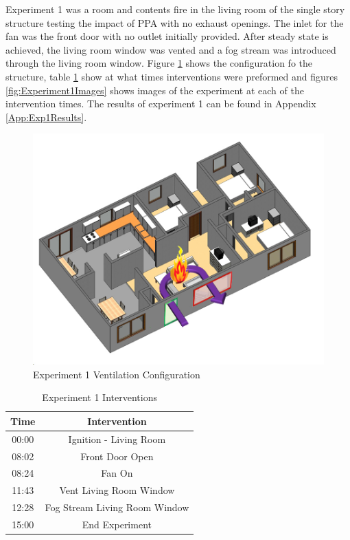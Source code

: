 \documentclass{article}
\begin{document}
Experiment 1 was a room and contents fire in the living room of the single story structure testing the impact of PPA with no exhaust openings. The inlet for the fan was the front door with no outlet initially provided. After steady state is achieved, the living room window was vented and a fog stream was introduced through the living room window. Figure \ref{fig:Exp1VentConfig} shows the configuration fo the structure, table \ref{Table:Exp1Interventions} show at what times interventions were preformed and figures \ref{fig:Experiment1Images} shows images of the experiment at each of the intervention times. The results of experiment 1 can be found in Appendix \ref{App:Exp1Results}.

 \begin{figure}[h!]
 	\centering
 	\includegraphics[width=5in]{0_Images/FireExperiments/Single_Story/Experiment_1.jpg}
 	\caption{Experiment 1 Ventilation Configuration}
 	\label{fig:Exp1VentConfig}
 \end{figure}

\begin{table}[H]
	\centering
	\caption{Experiment 1 Interventions}
	\begin{tabular}{|c|c|} 
		\hline
		Time & Intervention \\ \hline \hline
		00:00 & Ignition - Living Room \\ \hline
		08:02 & Front Door Open \\ \hline
		08:24 & Fan On \\ \hline
		11:43 & Vent Living Room Window \\ \hline
		12:28 & Fog Stream Living Room Window \\ \hline
		15:00 & End Experiment\\ \hline
	\end{tabular}
	\label{Table:Exp1Interventions}
\end{table}
\end{document}
